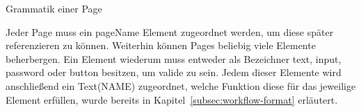 \begin{listing}[!ht]
    \inputminted[xleftmargin=20pt,linenos,firstnumber=23]{antlr}{listings/3.1/Page.g4}
    \caption{Grammatik einer Page}
    \label{listing:page}
\end{listing}

Jeder Page muss ein pageName Element zugeordnet werden, um diese später referenzieren zu können.
Weiterhin können Pages beliebig viele Elemente beherbergen.
Ein Element wiederum muss entweder als Bezeichner text, input, password oder button besitzen, um valide zu sein.
Jedem dieser Elemente wird anschließend ein Text(NAME) zugeordnet, welche Funktion diese für das jeweilige Element erfüllen, wurde bereits in Kapitel~\ref{subsec:workflow-format} erläutert.


